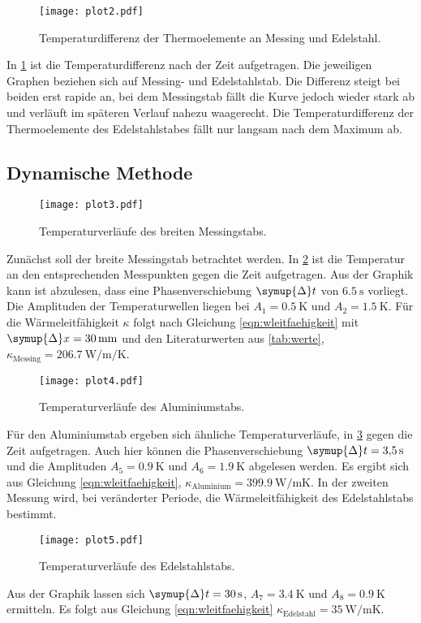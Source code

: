 %
\begin{figure}[H]
    \centering
    \texttt{[image: plot2.pdf]}
    \caption{Temperaturdifferenz der Thermoelemente an Messing und Edelstahl.}
    \label{fig:plot2}
\end{figure}
%
In \ref{fig:plot2} ist die Temperaturdifferenz nach der Zeit aufgetragen.
Die jeweiligen Graphen beziehen sich auf Messing- und Edelstahlstab.
Die Differenz steigt bei beiden erst rapide an, bei dem Messingstab fällt die Kurve jedoch 
wieder stark ab und verläuft im späteren Verlauf nahezu waagerecht.
Die Temperaturdifferenz der Thermoelemente des Edelstahlstabes fällt nur langsam nach dem Maximum ab.
%
\subsection{Dynamische Methode}
\begin{figure}
    \centering
    \texttt{[image: plot3.pdf]}
    \caption{Temperaturverläufe des breiten Messingstabs.}
    \label{fig:plot3}
\end{figure}
%
Zunächst soll der breite Messingstab betrachtet werden.
In \ref{fig:plot3} ist die Temperatur an den entsprechenden Messpunkten gegen die Zeit aufgetragen. 
Aus der Graphik kann ist abzulesen, dass eine Phasenverschiebung $\symup{\Delta} t$ von 
$\SI{6.5}{\second}$ vorliegt. Die Amplituden der Temperaturwellen liegen 
bei $A_1 = \SI{0.5}{\kelvin}$ und $A_2 = \SI{1.5}{\kelvin}$.
Für die Wärmeleitfähigkeit $\kappa$ folgt nach Gleichung \eqref{eqn:wleitfaehigkeit} mit 
$\symup{\Delta}x = \SI{30}{\milli\meter}$ und den Literaturwerten aus \ref{tab:werte}, 
$\kappa_\text{Messing} = \SI{206.7}{\watt\per\meter\per\kelvin}$.
%
\begin{figure}
    \centering
    \texttt{[image: plot4.pdf]}
    \caption{Temperaturverläufe des Aluminiumstabs.}
    \label{fig:plot4}
\end{figure}
%
Für den Aluminiumstab ergeben sich ähnliche Temperaturverläufe, in \ref{fig:plot4} gegen die Zeit aufgetragen. 
Auch hier können die Phasenverschiebung $\symup{\Delta} t = \SI{3.5}{\second}$ 
und die Amplituden $A_5 = \SI{0.9}{\kelvin}$ und $A_6 = \SI{1.9}{\kelvin}$ 
abgelesen werden. Es ergibt sich aus Gleichung \eqref{eqn:wleitfaehigkeit}, 
$\kappa_\text{Aluminium} = \SI{399.9}{\watt\per\meter\kelvin}$.
%
In der zweiten Messung wird, bei veränderter Periode, die Wärmeleitfähigkeit 
des Edelstahlstabs bestimmt.
%
\begin{figure}[H]
    \centering
    \texttt{[image: plot5.pdf]}
    \caption{Temperaturverläufe des Edelstahlstabs.}
    \label{fig:plot5}
\end{figure}
%
Aus der Graphik lassen sich $\symup{\Delta} t = \SI{30}{\second}$, $A_7 = \SI{3.4}{\kelvin}$ 
und $A_8 = \SI{0.9}{\kelvin}$ ermitteln.
Es folgt aus Gleichung \eqref{eqn:wleitfaehigkeit} $\kappa_\text{Edelstahl} = 
\SI{35}{\watt\per\meter\kelvin}$.

